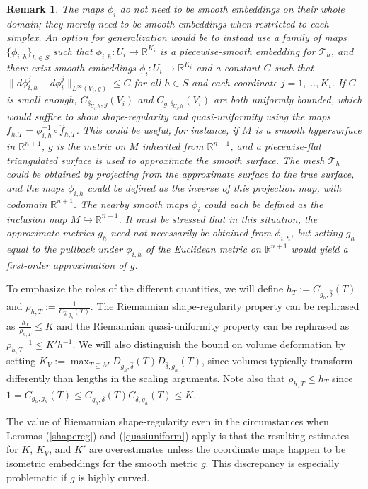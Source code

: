 \documentclass[11pt]{article}
\newtheorem{remark}[theorem]{Remark}
\begin{document}
\begin{remark}\label{weakercoords}
    The maps $\phi_i$ do not need to be smooth embeddings on their whole domain; they merely need to be smooth embeddings when restricted to each simplex. An option for generalization would be to instead use a family of maps $\{\phi_{i,h}\}_{h \in S}$ such that $\phi_{i,h}: U_i \to \mathbb{R}^{K_i}$ is a piecewise-smooth embedding for $\mathcal{T}_h$, and there exist smooth embeddings $\phi_i: U_i \to \mathbb{R}^{K_i}$ and a constant $C$ such that $\|d\phi_{i,h}^j -  d\phi_i^j\|_{L^\infty(V_i,g)} \le C$ for all $h \in S$ and each coordinate $j = 1, \dots, K_i$. If $C$ is small enough, $C_{\delta_{U_i,h},g}(V_i)$ and $C_{g,\delta_{U_i,h}}(V_i)$ are both uniformly bounded, which would suffice to show shape-regularity and quasi-uniformity using the maps $f_{h,T} = \phi_{i,h}^{-1} \circ \hat{f}_{h,T}$. This could be useful, for instance, if $M$ is a smooth hypersurface in $\mathbb{R}^{n+1}$, $g$ is the metric on $M$ inherited from $\mathbb{R}^{n+1}$, and a piecewise-flat triangulated surface is used to approximate the smooth surface. The mesh $\mathcal{T}_h$ could be obtained by projecting from the approximate surface to the true surface, and the maps $\phi_{i,h}$ could be defined as the inverse of this projection map, with codomain $\mathbb{R}^{n+1}$.  The nearby smooth maps $\phi_i$ could each be defined as the inclusion map $M \hookrightarrow \mathbb{R}^{n+1}$. It must be stressed that in this situation, the approximate metrics $g_h$ need not necessarily be obtained from $\phi_{i,h}$, but setting $g_h$ equal to the pullback under $\phi_{i,h}$ of the Euclidean metric on $\mathbb{R}^{n+1}$ would yield a first-order approximation of $g$.
\end{remark}

To emphasize the roles of the different quantities, we will define $h_T := C_{g_h,\hat \delta}(T)$ and $\rho_{h,T} := \frac{1}{C_{\hat \delta, g_h}(T)}$. The Riemannian shape-regularity property can be rephrased as $\frac{h_T}{\rho_{h,T}} \le K$ and the Riemannian quasi-uniformity property can be rephrased as ${\rho_{h,T}}^{-1} \le K'h^{-1}$. We will also distinguish the bound on volume deformation by setting $K_V := \max_{T \subseteq M} D_{g_h,\hat \delta}(T)D_{\hat \delta,g_h}(T)$, since volumes typically transform differently than lengths in the scaling arguments. Note also that $\rho_{h,T} \le h_T$ since $1 = C_{g_h,g_h}(T) \le C_{g_h,\hat \delta}(T)C_{\hat\delta,g_h}(T) \le K$.


The value of Riemannian shape-regularity even in the circumstances when Lemmas (\ref{shapereg}) and (\ref{quasiuniform}) apply is that the resulting estimates for $K$, $K_V$, and $K'$ are overestimates unless the coordinate maps happen to be isometric embeddings for the smooth metric $g$. This discrepancy is especially problematic if $g$ is highly curved.
\end{document}
